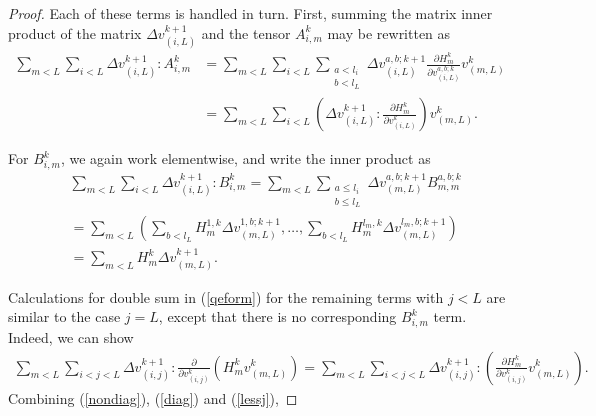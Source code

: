 \documentclass{jcmlatex}
\begin{document}
\begin{proof}
Each of these terms is handled in turn.  First, summing the matrix inner product of the matrix $\Delta v_{(i,L)}^{k+1}$ and the tensor $A_{i,m}^k$  may be rewritten as
\begin{align}
\sum_{m<L}\sum_{i< L} \Delta v_{(i,L)}^{k+1}:A_{i,m}^k 
  &= \sum_{m<L} \sum_{i<L} \sum_{\substack{a<l_i\\b<l_L}}\Delta v_{(i,L)}^{a,b;k+1}\frac{\partial
 H_m^{k} }{\partial v_{(i,L)}^{a,b;k}}v_{(m,L)}^k\\
&= \sum_{m<L} \sum_{i< L} \left(\Delta v_{(i,L)}^{k+1}:\frac{\partial H_m^k }{\partial
v_{(i,L)}^k}\right)v^k_{(m,L)}.
 \label{nondiag}
\end{align}

For $B_{i,m}^k$, we again work elementwise, and write the inner product as
\begin{align}
&\sum_{m<L}\sum_{i< L} \Delta v_{(i,L)}^{k+1}:B_{i,m}^k
  = \sum_{m<L} \sum_{\substack{a\le l_i\\b\le l_L}}\Delta v_{(m,L)}^{a,b;k+1}B_{m,m}^{a,b;k}\\
     &=\sum_{m<L}\left(\sum_{b<l_L}H_m^{1,k}\Delta v_{(m,L)}^{1,b;k+1}, \dots,
\sum_{b<l_L}H_m^{l_m,k}\Delta v_{(m,L)}^{l_m,b;k+1}\right)\\&=\sum_{m<L}H_m^k\Delta
v_{(m,L)}^{k+1}.\label{diag}
\end{align}

Calculations for double sum in (\ref{qeform}) for the remaining terms with $j<L$ are similar to the case $j = L$, except that there is
no corresponding $B_{i,m}^k$ term. Indeed, we can show
\begin{align} 
\sum_{m<L}\sum_{i<j< L} \Delta v_{(i,j)}^{k+1}:
\frac{\partial }{\partial v_{(i,j)}^k}\left(H_m^{k}v_{(m,L)}^k \right) 
 = \sum_{m<L}\sum_{i<j< L}\Delta v_{(i,j)}^{k+1}:\left(\frac{\partial H_m^k}{\partial
v_{(i,j)}^k}v_{(m,L)}^k\right). \label{lessj} \end{align}
Combining (\ref{nondiag}), (\ref{diag}) and (\ref{lessj}),


\end{proof}
\end{document}
